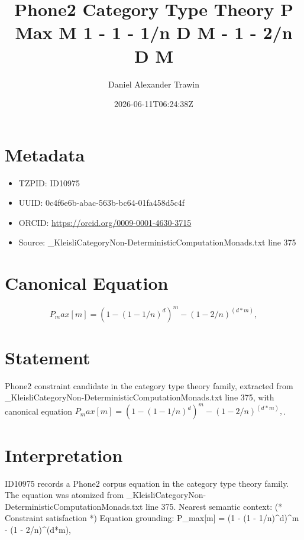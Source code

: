 \documentclass[11pt]{article}
\title{Phone2 Category Type Theory P Max M 1 - 1 - 1/n D M - 1 - 2/n D M}
\author{Daniel Alexander Trawin}
\date{2026-06-11T06:24:38Z}
\begin{document}
\maketitle
\section*{Metadata}
\begin{itemize}
\item TZPID: ID10975
\item UUID: 0c4f6e6b-abac-563b-bc64-01fa458d5c4f
\item ORCID: \url{https://orcid.org/0009-0001-4630-3715}
\item Source: _KleisliCategoryNon-DeterministicComputationMonads.txt line 375
\end{itemize}
\section*{Canonical Equation}
\[
P_max[m] = (1 - (1 - 1/n)^d)^m - (1 - 2/n)^(d*m),
\]
\section*{Statement}
Phone2 constraint candidate in the category type theory family, extracted from _KleisliCategoryNon-DeterministicComputationMonads.txt line 375, with canonical equation $P_max[m] = (1 - (1 - 1/n)^d)^m - (1 - 2/n)^(d*m),$.
\section*{Interpretation}
ID10975 records a Phone2 corpus equation in the category type theory family. The equation was atomized from _KleisliCategoryNon-DeterministicComputationMonads.txt line 375. Nearest semantic context: (* Constraint satisfaction *) Equation grounding: P_max[m] = (1 - (1 - 1/n)^d)^m - (1 - 2/n)^(d*m),
\end{document}
